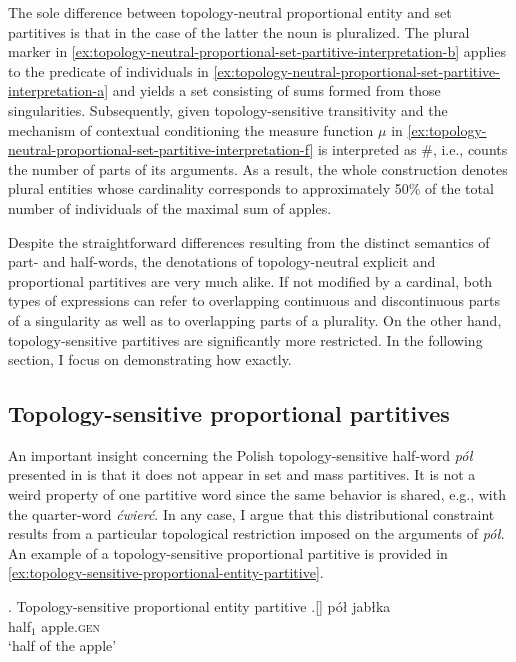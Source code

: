 	The sole difference between topology-neutral proportional entity and set partitives is that in the case of the latter the noun is pluralized. The plural marker in \ref{ex:topology-neutral-proportional-set-partitive-interpretation-b} applies to the predicate of  individuals in \ref{ex:topology-neutral-proportional-set-partitive-interpretation-a} and yields a set consisting of sums formed from those singularities. Subsequently, given topology-sensitive transitivity and the mechanism of contextual conditioning the measure function $\mu$ in \ref{ex:topology-neutral-proportional-set-partitive-interpretation-f} is interpreted as $\#$, i.e., counts the number of  parts of its arguments. As a result, the whole construction denotes plural entities whose cardinality corresponds to approximately 50\% of the total number of individuals of the maximal sum of apples. 
	
	Despite the straightforward differences resulting from the distinct semantics of part- and half-words, the denotations of topology-neutral explicit and proportional partitives are very much alike. If not modified by a cardinal, both types of expressions can refer to overlapping continuous and discontinuous parts of a singularity as well as to overlapping parts of a plurality. On the other hand, topology-sensitive partitives are significantly more restricted. In the following section, I focus on demonstrating how exactly.
	
	\subsection{Topology-sensitive proportional partitives}\label{sec:topology-sensitive-proportional-partitives}
	
	An important insight concerning the Polish topology-sensitive half-word \textit{pół} presented in  is that it does not appear in set and mass partitives. It is not a weird property of one partitive word since the same behavior is shared, e.g., with the quarter-word \textit{ćwierć}. In any case, I argue that this distributional constraint results from a particular topological restriction imposed on the arguments of \textit{pół}. An example of a topology-sensitive proportional partitive is provided in \ref{ex:topology-sensitive-proportional-entity-partitive}.
	
	\ex. Topology-sensitive proportional entity partitive\label{ex:topology-sensitive-proportional-entity-partitive}
	\bg.[] pół jabłka\\
	half$_1$ apple\textsc{.gen}\\
	`half of the apple'

